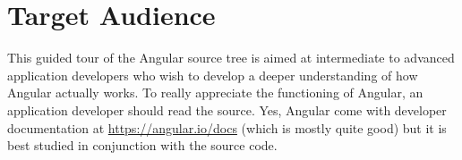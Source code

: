 \section{Target Audience}

This guided tour of the Angular source tree is aimed at intermediate to advanced
application developers who wish to develop a deeper understanding of how Angular
actually works. To really appreciate the functioning of Angular, an application
developer should read the source. Yes, Angular come with developer documentation
at
\url{https://angular.io/docs}
(which is mostly quite good) but it is best studied in
conjunction with the source code.
